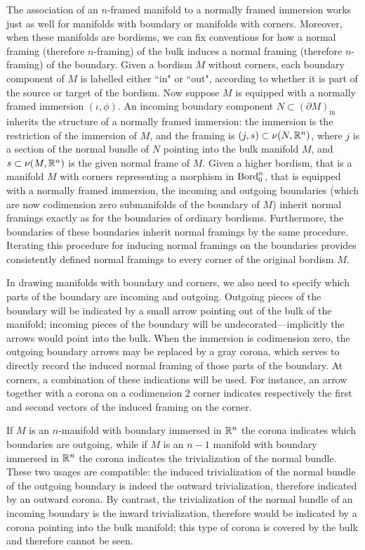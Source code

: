 \documentclass{amsart}
\begin{document}
The association of an $n$-framed manifold to a normally framed immersion works just as well for manifolds with boundary or manifolds with corners.  Moreover, when these manifolds are bordisms, we can fix conventions for how a normal framing (therefore $n$-framing) of the bulk induces a normal framing (therefore $n$-framing) of the boundary.  Given a bordism $M$ without corners, each boundary component of $M$ is labelled either ``in" or ``out", according to whether it is part of the source or target of the bordism.  Now suppose $M$ is equipped with a normally framed immersion $(\iota,\phi)$.  An incoming boundary component $N \subset (\partial M)_{\textrm{in}}$ inherits the structure of a normally framed immersion: the immersion is the restriction of the immersion of $M$, and the framing is $(j, s) \subset \nu(N,\mathbb R^n)$, where $j$ is a section of the normal bundle of $N$ pointing into the bulk manifold $M$, and $s \subset \nu(M,\mathbb R^n)$ is the given normal frame of $M$.  Given a higher bordism, that is a manifold $M$ with corners representing a morphism in $\mathrm{Bord}_0^n$, that is equipped with a normally framed immersion, the incoming and outgoing boundaries (which are now codimension zero submanifolds of the boundary of $M$) inherit normal framings exactly as for the boundaries of ordinary bordisms.  Furthermore, the boundaries of these boundaries inherit normal framings by the same procedure.  Iterating this procedure for inducing normal framings on the boundaries provides consistently defined normal framings to every corner of the original bordism $M$.

In drawing manifolds with boundary and corners, we also need to specify which parts of the boundary are incoming and outgoing.  Outgoing pieces of the boundary will be indicated by a small arrow pointing out of the bulk of the manifold; incoming pieces of the boundary will be undecorated---implicitly the arrows would point into the bulk.  When the immersion is codimension zero, the outgoing boundary arrows may be replaced by a gray corona, which serves to directly record the induced normal framing of those parts of the boundary.  At corners, a combination of these indications will be used.  For instance, an arrow together with a corona on a codimension 2 corner indicates respectively the first and second vectors of the induced framing on the corner.

\begin{warning}
If $M$ is an $n$-manifold with boundary immersed in $\mathbb R^n$ the corona indicates which boundaries are outgoing, while if $M$ is an $n-1$ manifold with boundary immersed in $\mathbb R^n$ the corona indicates the trivialization of the normal bundle.  These two usages are compatible: the induced trivialization of the normal bundle of the outgoing boundary is indeed the outward trivialization, therefore indicated by an outward corona.  By contrast, the trivialization of the normal bundle of an incoming boundary is the inward trivialization, therefore would be indicated by a corona pointing into the bulk manifold; this type of corona is covered by the bulk and therefore cannot be seen.
\end{warning}
\end{document}
